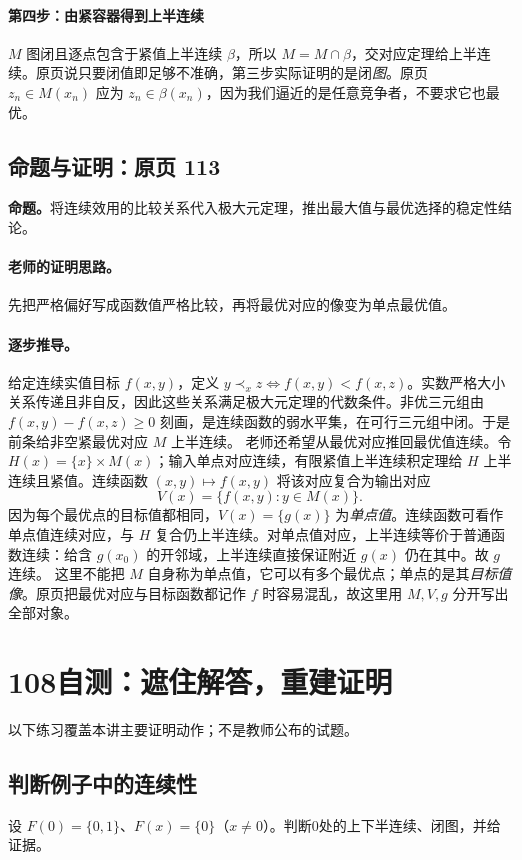 \paragraph{第四步：由紧容器得到上半连续}
$M$ 图闭且逐点包含于紧值上半连续 $\beta$，所以 $M=M\cap\beta$，交对应定理给上半连续。原页说只要闭值即足够不准确，第三步实际证明的是闭\emph{图}。原页 $z_n\in M(x_n)$ 应为 $z_n\in\beta(x_n)$，因为我们逼近的是任意竞争者，不要求它也最优。


\subsection{命题与证明：原页 113}

\textbf{命题。}将连续效用的比较关系代入极大元定理，推出最大值与最优选择的稳定性结论。

\paragraph{老师的证明思路。}先把严格偏好写成函数值严格比较，再将最优对应的像变为单点最优值。

\paragraph{逐步推导。}
给定连续实值目标 $f(x,y)$，定义 $y\prec_x z\iff f(x,y)<f(x,z)$。实数严格大小关系传递且非自反，因此这些关系满足极大元定理的代数条件。非优三元组由 $f(x,y)-f(x,z)\ge0$ 刻画，是连续函数的弱水平集，在可行三元组中闭。于是前条给非空紧最优对应 $M$ 上半连续。
老师还希望从最优对应推回最优值连续。令 $H(x)=\{x\}\times M(x)$；输入单点对应连续，有限紧值上半连续积定理给 $H$ 上半连续且紧值。连续函数 $(x,y)\mapsto f(x,y)$ 将该对应复合为输出对应
\[V(x)=\{f(x,y):y\in M(x)\}.\]
因为每个最优点的目标值都相同，$V(x)=\{g(x)\}$ 为\emph{单点值}。连续函数可看作单点值连续对应，与 $H$ 复合仍上半连续。对单点值对应，上半连续等价于普通函数连续：给含 $g(x_0)$ 的开邻域，上半连续直接保证附近 $g(x)$ 仍在其中。故 $g$ 连续。
这里不能把 $M$ 自身称为单点值，它可以有多个最优点；单点的是其\emph{目标值像}。原页把最优对应与目标函数都记作 $f$ 时容易混乱，故这里用 $M,V,g$ 分开写出全部对象。


\clearpage\section{108自测：遮住解答，重建证明}
以下练习覆盖本讲主要证明动作；不是教师公布的试题。
\subsection{判断例子中的连续性}
设 $F(0)=\{0,1\}$、$F(x)=\{0\}$（$x\ne0$）。判断0处的上下半连续、闭图，并给证据。
